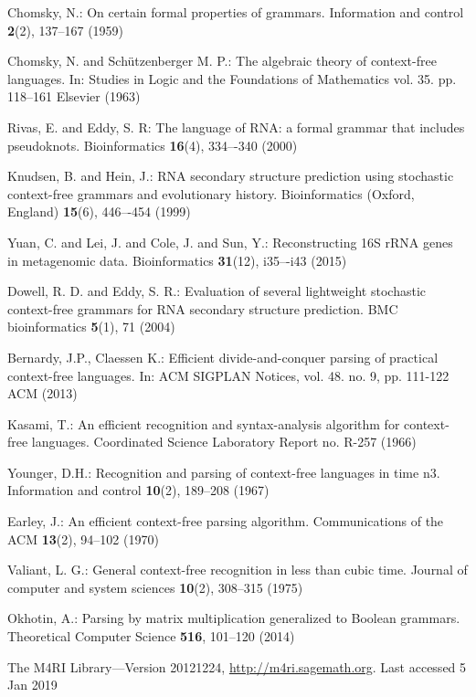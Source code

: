 \documentclass[runningheads]{llncs}
\begin{document}
%
%
%
% 
% 
%
\begin{thebibliography}{8}
Chomsky, N.: On certain formal properties of grammars. Information and control \textbf{2}(2), 137--167 (1959)

Chomsky, N. and Schützenberger M. P.: The algebraic theory of context-free languages. In: Studies in Logic and the Foundations of Mathematics vol. 35. pp. 118--161 Elsevier (1963)

Rivas, E. and Eddy, S. R: The language of RNA: a formal grammar that includes pseudoknots. Bioinformatics \textbf{16}(4), 334–-340 (2000)

Knudsen, B. and Hein, J.: RNA secondary structure prediction using stochastic context-free grammars and evolutionary history. Bioinformatics (Oxford, England) \textbf{15}(6), 446–-454 (1999)

Yuan, C. and Lei, J. and Cole, J. and Sun, Y.: Reconstructing 16S rRNA genes in metagenomic data. Bioinformatics \textbf{31}(12), i35–-i43 (2015)

Dowell, R. D. and Eddy, S. R.: Evaluation of several lightweight stochastic context-free grammars for RNA secondary structure prediction. BMC bioinformatics \textbf{5}(1), 71 (2004)

Bernardy, J.P., Claessen K.: Efficient divide-and-conquer parsing of practical context-free languages. In: ACM SIGPLAN Notices, vol. 48. no. 9, pp. 111-122 ACM (2013)

Kasami, T.: An efficient recognition and syntax-analysis algorithm for context-free languages. Coordinated Science Laboratory Report no. R-257 (1966)

Younger, D.H.: Recognition and parsing of context-free languages in time n3. Information and control \textbf{10}(2), 189--208 (1967)

Earley, J.: An efficient context-free parsing algorithm. Communications of the ACM \textbf{13}(2), 94--102 (1970)

Valiant, L. G.: General context-free recognition in less than cubic time. Journal of computer and system sciences \textbf{10}(2), 308--315 (1975)

Okhotin, A.: Parsing by matrix multiplication generalized to Boolean grammars. Theoretical Computer Science \textbf{516}, 101--120 (2014)

The M4RI Library---Version 20121224, \url{http://m4ri.sagemath.org}. Last accessed 5
Jan 2019


\end{thebibliography}
\end{document}
